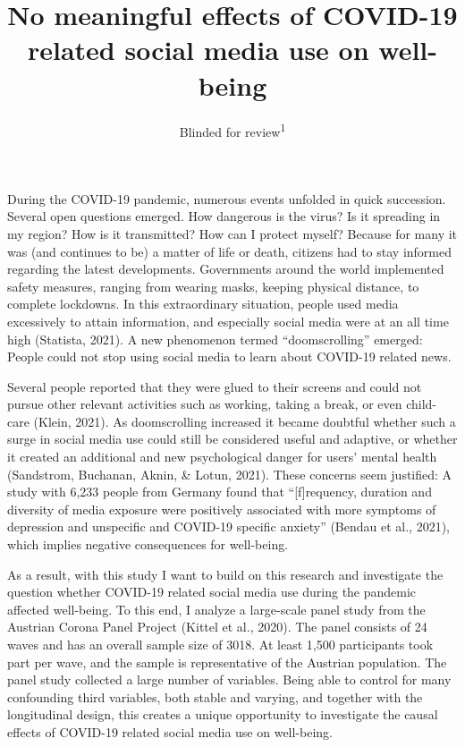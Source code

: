 \documentclass[
  english,
  man,mask,floatsintext]{apa6}
\title{No meaningful effects of COVID-19 related social media use on well-being}
\author{Blinded for review\textsuperscript{1}}
\date{}
\affiliation{\vspace{0.5cm}\textsuperscript{1} Blinded for review}
\begin{document}
\maketitle

During the COVID-19 pandemic,
numerous events unfolded in quick succession.
Several open questions emerged.
How dangerous is the virus?
Is it spreading in my region?
How is it transmitted?
How can I protect myself?
Because for many it was (and continues to be) a matter of life or death, citizens had to stay informed regarding the latest developments.
Governments around the world implemented safety measures, ranging from wearing masks, keeping physical distance, to complete lockdowns.
In this extraordinary situation, people used media excessively to attain information, and especially social media were at an all time high (Statista, 2021).
A new phenomenon termed ``doomscrolling'' emerged:
People could not stop using social media to learn about COVID-19 related news.

Several people reported that they were glued to their screens and could not pursue other relevant activities such as working, taking a break, or even child-care (Klein, 2021).
As doomscrolling increased it became doubtful whether such a surge in social media use could still be considered useful and adaptive, or whether it created an additional and new psychological danger for users' mental health (Sandstrom, Buchanan, Aknin, \& Lotun, 2021).
These concerns seem justified: A study with 6,233 people from Germany found that ``{[}f{]}requency, duration and diversity of media exposure were positively associated with more symptoms of depression and unspecific and COVID-19 specific anxiety'' (Bendau et al., 2021), which implies negative consequences for well-being.

As a result, with this study I want to build on this research and investigate the question whether COVID-19 related social media use during the pandemic affected well-being.
To this end, I analyze a large-scale panel study from the Austrian Corona Panel Project (Kittel et al., 2020).
The panel consists of 24 waves and has an overall sample size of 3018.
At least 1,500 participants took part per wave, and the sample is representative of the Austrian population.
The panel study collected a large number of variables.
Being able to control for many confounding third variables, both stable and varying, and together with the longitudinal design, this creates a unique opportunity to investigate the causal effects of COVID-19 related social media use on well-being.
\end{document}
